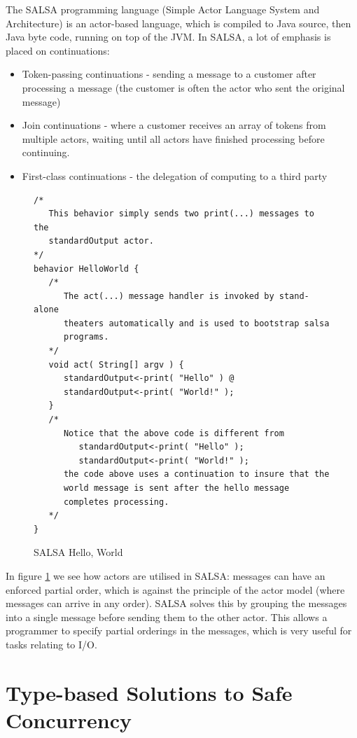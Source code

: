 \documentclass[11pt,a4paper]{report}
\begin{document}
The SALSA programming language (Simple Actor Language System and Architecture) is an actor-based language, which is compiled to Java source, then Java byte code, running on top of the JVM.
In SALSA, a lot of emphasis is placed on continuations:
\begin{itemize}[noitemsep]
	\item Token-passing continuations - sending a message to a customer after processing a message (the customer is often the actor who sent the original message)
	\item Join continuations - where a customer receives an array of tokens from multiple actors, waiting until all actors have finished processing before continuing.
	\item First-class continuations - the delegation of computing to a third party\cite{salsa-continuations}
\end{itemize}

\begin{figure}[H]
\begin{verbatim}
/*
   This behavior simply sends two print(...) messages to the
   standardOutput actor.
*/
behavior HelloWorld {
   /*
      The act(...) message handler is invoked by stand-alone
      theaters automatically and is used to bootstrap salsa
      programs.
   */
   void act( String[] argv ) {
      standardOutput<-print( "Hello" ) @
      standardOutput<-print( "World!" );
   }
   /*
      Notice that the above code is different from
         standardOutput<-print( "Hello" );
         standardOutput<-print( "World!" );
      the code above uses a continuation to insure that the
      world message is sent after the hello message
      completes processing.
   */
}
\end{verbatim}
\caption{SALSA Hello, World\cite{salsa-example}}
\label{fig:salsa-helloworld}
\end{figure}

In figure \ref{fig:salsa-helloworld} we see how actors are utilised in SALSA: messages can have an enforced partial order, which is against the principle of the actor model (where messages can arrive in any order).
SALSA solves this by grouping the messages into a single message before sending them to the other actor.
This allows a programmer to specify partial orderings in the messages, which is very useful for tasks relating to I/O.

\newpage
\section{Type-based Solutions to Safe Concurrency}
\end{document}

